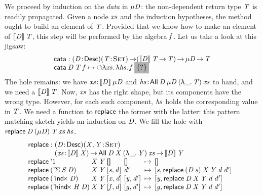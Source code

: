 We proceed by induction on the \emph{data} in \(\Mu{\V{D}}\):
the non-dependent return type $\V{T}$ is readily propagated.
Given a node $\V{xs}$
and the induction hypotheses, the method ought to build an element of
$\V{T}$. Provided that we know how to make an element of
$\descop{\V{D}}{\V{T}}$, this step will be performed by the algebra
$\V{f}$. Let us take a look at this jigsaw:
%
\[\stk{
\cata : \PITEL{\V{D}}{\Desc}
           \PI{\V{T}}{\Set}
           (\descop{\V{D}}{\V{T}} \To \V{T}) \To 
           \Mu{\V{D}} \To \V{T} \\
\cata\: \V{D}\: \V{T}\: \V{f} \mapsto
  \sind \LAM{\V{xs}}\LAM{\V{hs}} \V{f}\: \SHED
}\]
% 
The hole remains: we have
\(\Bhab{\V{xs}}{\descop{\V{D}}{\Mu{\V{D}}}}\) and
\(\Bhab{\V{hs}}{\All{\V{D}}{\Mu{\V{D}}}{(\LAM{\_} \V{T})}{\V{xs}}}\)
to hand, and we need a \(\descop{\V{D}}{\V{T}}\).
Now, $\V{xs}$ has the right shape, but its
components have the wrong type. However, for each such
component, $\V{hs}$ holds the corresponding value
in $\V{T}$.  We need a function to \(\F{replace}\) the former with the latter:
this pattern
matching sketch yields an induction on \(\V{D}\). We fill the hole
with \(\F{replace}\: \V{D}\:(\Mu{\V{D}})\: \V{T}\: \V{xs}\: \V{hs}\).
%
\[\stk{
\F{replace} : \stk{\PITEL{\V{D}}{\Desc}
                   \PITEL{\V{X},\V{Y}}{\Set}\\
                   \PI{\V{xs}}{\descop{\V{D}}{\V{X}}} 
                   \All{\V{D}}{\V{X}}{(\LAM{\_}\V{Y})}{\V{xs}} \To
                   \descop{\V{D}}{\V{Y}}} \\
\begin{array}{@{}l@{\:}l@{\:}l@{\:\:\mapsto\:\:}l}
\F{replace}\: \DUnit &          \V{X}\: \V{Y}\: \Void&          \Void   &
    \Void  \\
\F{replace}\: (\DSigma{\V{S}}{\V{D}})& \V{X}\: \V{Y}\: \pair{\V{s}}{\V{d}}{}& \V{d'}  &
    \pair{\V{s}}{\F{replace}\: (\V{D}\: \V{s})\: \V{X}\: \V{Y}\: \V{d}\: \V{d'}}{} \\
\F{replace}\: (\DIndx{\V{D}})&     \V{X}\: \V{Y}\: \pair{\V{x}}{\V{d}}{}& \pair{\V{y}}{\V{d'}}{} &
    \pair{\V{y}}{\F{replace}\: \V{D}\: \V{X}\: \V{Y}\: \V{d}\: \V{d'}}{} \\
\F{replace}\: (\DHindx{\V{H}}{\V{D}})& \V{X}\: \V{Y}\: \pair{\V{f}}{\V{d}}{}& \pair{\V{g}}{\V{d'}}{} &
 \pair{\V{g}}{\F{replace}\: \V{D}\: \V{X}\: \V{Y}\: \V{d}\: \V{d'}}{}
\end{array}
}\]
%


